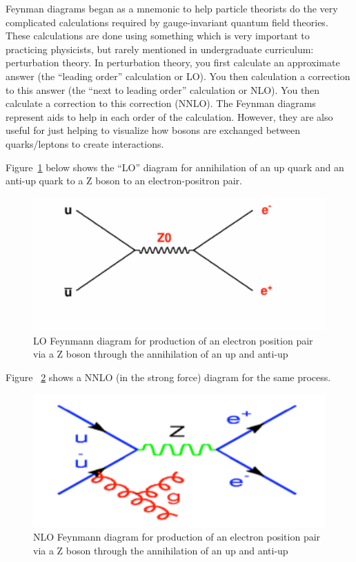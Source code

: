 Feynman diagrams began as a mnemonic to help particle theorists do the very complicated calculations required by gauge-invariant quantum field theories.  These calculations are done using something which is very important to practicing physicists, but rarely mentioned in undergraduate curriculum: perturbation theory.  In perturbation theory, you first calculate an approximate answer (the “leading order” calculation or LO).  You then calculation a correction to this answer (the “next to leading order” calculation or NLO).  You then calculate a correction to this correction (NNLO).  The Feynman diagrams represent aids to help in each order of the calculation.  However, they are also useful for just helping to visualize how bosons are exchanged between quarks/leptons to create interactions.

Figure~\ref{fig:fig8} below shows the “LO” diagram for annihilation of an up quark and an anti-up quark to a Z boson to an electron-positron pair.


\begin{figure}[h]
\centering\includegraphics[scale=0.5]{./ElementaryParticles/Pictures/fig8.pdf}
\caption{LO Feynmann diagram for production of an electron position pair via a Z boson through the annihilation of an up and anti-up}
\label{fig:fig8}
\end{figure}
 

Figure ~\ref{fig:fig9} shows a NNLO (in the strong force) diagram for the same process.
 
\begin{figure}[h]
\centering\includegraphics[scale=0.5]{./ElementaryParticles/Pictures/fig9.pdf}
\caption{NLO Feynmann diagram for production of an electron position pair via a Z boson through the annihilation of an up and anti-up}
\label{fig:fig9}
\end{figure}


